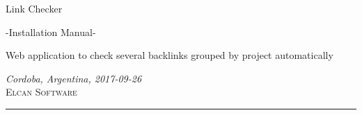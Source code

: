 \documentclass[a4paper]{article}
\author{%
	Mario O. Villarroel \\
	Customer Care/System Design\\
	\texttt{movilla@elcansoftware.com}\vspace{20pt} \\
	Juan P. Aguilar\\
	System Development \\
	\texttt{aguilarjpb@elcansoftware.com}
}
\def\documentdate{Cordoba, Argentina, 2017-09-26}
\begin{document}
	\begin{titlepage}
		\noindent
		\titlefont Link Checker\par
		\vspace*{15pt}
		\subtitlefont -Installation Manual-
		\epigraph{Web application to check several backlinks grouped by project automatically}%
		{\textit{\documentdate}\\ \textsc{Elcan Software}}
		\null\vfill
		\vspace*{1cm}
		\noindent
		\hfill
		\begin{minipage}{0.50\linewidth}
		    \begin{flushright}
		        \printauthor
		    \end{flushright}
		\end{minipage}
		\begin{minipage}{0.02\linewidth}
		    \rule{1pt}{125pt}
		\end{minipage}
		\titlepagedecoration
	\end{titlepage}
	
	
\end{document}
